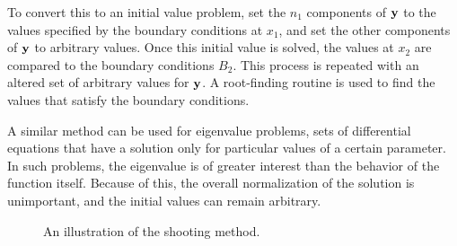 To convert this to an initial value problem, set the $n_1$ components of $\bf{y}$ to the values specified by the boundary conditions at $x_1$, and set the other components of $\bf{y}$ to arbitrary values.
Once this initial value is solved, the values at $x_2$ are compared to the boundary conditions $B_2$.
This process is repeated with an altered set of arbitrary values for $\bf{y}$. 
A root-finding routine is used to find the values that satisfy the boundary conditions.

A similar method can be used for eigenvalue problems, sets of differential equations that have a solution only for particular values of a certain parameter.
In such problems, the eigenvalue is of greater interest than the behavior of the function itself. 
Because of this, the overall normalization of the solution is unimportant, and the initial values can remain arbitrary. 

\begin{figure}[htb]
\caption{An illustration of the shooting method.}
\label{fig:shooting}
\end{figure}